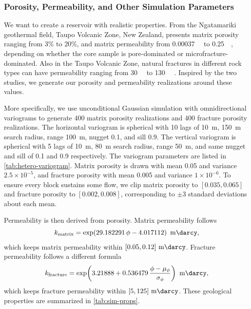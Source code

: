 \documentclass[pdflatex,sn-mathphys-ay]{sn-jnl}
\begin{document}
\subsubsection{Porosity, Permeability, and Other Simulation Parameters}
\label{sec:rock}
We want to create a reservoir with realistic properties. From the Ngatamariki geothermal field, Taupo Volcanic Zone, New Zealand, \cite{matrixTaupo}
presents matrix porosity ranging from 3\% to 20\%, and matrix permeability from \SI{0.00037}{\milli\darcy} to \SI{0.25}{\milli\darcy}, depending on whether the core
sample is pore-dominated or microfracture-dominated. Also in the Taupo Volcanic Zone, natural fractures in different rock types
can have permeability ranging from \SI{30}{\milli\darcy} to \SI{130}{\milli\darcy} \citep{fractureTaupo}. Inspired by the two studies, we generate our porosity and permeability realizations 
around these values. 

More specifically, we use unconditional Gaussian simulation with omnidirectional variograms
to generate 400 matrix porosity realizations and 400 fracture porosity realizations. The horizontal variogram is spherical with 10 lags of 
\SI{10}{\meter}, \SI{150}{\meter} search
radius, range \SI{100}{\meter}, nugget 0.1, and sill 0.9. The vertical variogram
is spherical with 5 lags of \SI{10}{\meter},
\SI{80}{\meter} search radius, range \SI{50}{\meter}, and same nugget and sill of 0.1 and 0.9 respectively. The variogram parameters are listed in \cref{tab:hetero-variogram}.
Matrix porosity is drawn with mean 0.05 and variance $2.5 \times 10^{-5}$, and
fracture porosity with mean 0.005 and variance $1 \times 10^{-6}$. To ensure
every block sustains some flow, we clip matrix porosity to $[0.035, 0.065]$ and
fracture porosity to $[0.002, 0.008]$, corresponding to $\pm 3$ standard
deviations about each mean.

Permeability is then derived from porosity. Matrix permeability follows
\begin{equation}
  k_{\text{matrix}} = \exp\!\left(29.182291\,\phi - 4.017112\right)\ \si{\milli\darcy},
  \label{eq:k-matrix}
\end{equation}
which keeps matrix permeability within $[0.05, 0.12]\ \si{\milli\darcy}$.
Fracture permeability follows a different formula
\begin{equation}
  k_{\text{fracture}} = \exp\!\left(3.21888 + 0.536479\,
    \frac{\phi - \mu_\phi}{\sigma_\phi}\right)\ \si{\milli\darcy},
  \label{eq:k-fracture}
\end{equation}
which keeps fracture permeability within $[5, 125]\ \si{\milli\darcy}$. These geological properties are summarized in \cref{tab:sim-props}. 
\end{document}
